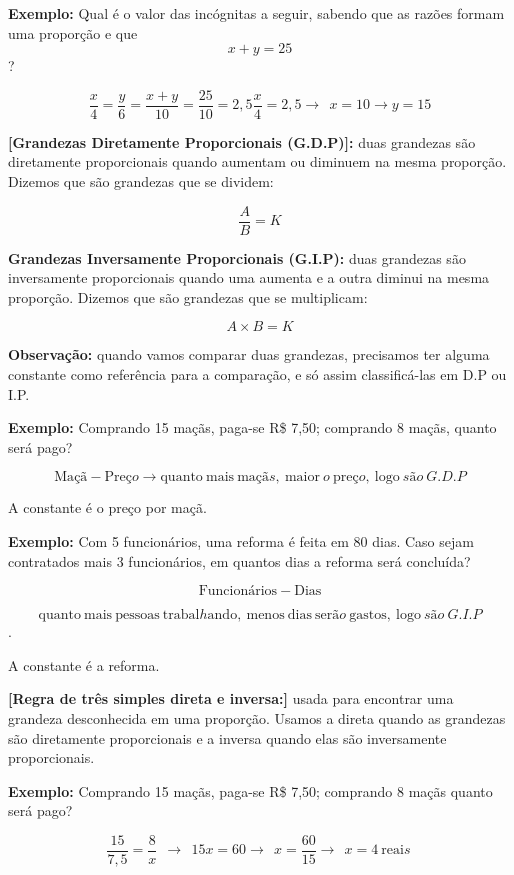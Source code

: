 \textbf{Exemplo:} Qual é o valor das incógnitas a seguir, sabendo que as
razões formam uma proporção e que \[x + y = 25\]?

\[\frac{x}{4} = \frac{y}{6} = \frac{x + y}{10} = \frac{25}{10} = 2,5\frac{x}{4} = 2,5 \rightarrow \ \ x = 10 \rightarrow y = 15\]

\textbf{{[}Grandezas Diretamente Proporcionais (G.D.P){]}:} duas
grandezas são diretamente proporcionais quando aumentam ou diminuem na
mesma proporção. Dizemos que são grandezas que se dividem:

\[\frac{A}{B} = K\]

\textbf{{Grandezas Inversamente Proporcionais (G.I.P)}:} duas grandezas
são inversamente proporcionais quando uma aumenta e a outra diminui na
mesma proporção. Dizemos que são grandezas que se multiplicam:

\[A \times B = K\]

\textbf{Observação:} quando vamos comparar duas grandezas, precisamos
ter alguma constante como referência para a comparação, e só assim
classificá-las em D.P ou I.P.

\textbf{Exemplo:} Comprando 15 maçãs, paga-se R\$ 7,50; comprando 8
maçãs, quanto será pago?

\[\text{Ma}çã - \text{Pre}ço \rightarrow \text{quanto}\ \text{mais}\ \text{ma}çãs,\ \text{maior}\ o\ \text{pre}ço,\ \text{logo}\ são\ G.D.P\]

A constante é o preço por maçã.

\textbf{Exemplo:} Com 5 funcionários, uma reforma é feita em 80 dias.
Caso sejam contratados mais 3 funcionários, em quantos dias a reforma
será concluída?

\[\text{Funcion}á\text{rios} - \text{Dias}\]

\[\text{quanto}\ \text{mais}\ \text{pessoas}\ \text{trabal}h\text{ando},\ \text{menos}\ \text{dias}\ \text{ser}ão\ \text{gastos},\ \text{logo}\ são\ G.I.P\].

A constante é a reforma.

\textbf{{[}Regra de três simples direta e inversa:{]}} usada para
encontrar uma grandeza desconhecida em uma proporção. Usamos a direta
quando as grandezas são diretamente proporcionais e a inversa quando
elas são inversamente proporcionais.

\textbf{Exemplo:} Comprando 15 maçãs, paga-se R\$ 7,50; comprando 8
maçãs quanto será pago?

\[\frac{15}{7,5} = \frac{8}{x}\ \  \rightarrow \ \ 15x = 60 \rightarrow \ \ x = \frac{60}{15} \rightarrow \ \ x = 4\ \text{reai}s\ \]

